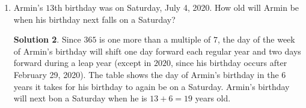 \documentclass{article}
\theoremstyle{definition}
\newtheorem*{solution}{Solution}
\begin{document}
\begin{multicols}{2}
\begin{enumerate}
\begin{solution}
                So, we have $A + B + C+ 2(D + E + F) + 72 = 293$, which simplifies to $A + B + C + 2(D + E + F) = 221$.
                We also know that $A + B + C + D + E + F + 24 + 5 = 200$, which simplifies to $A + B + C + D + E + F = 171$.
                The difference between these two equations is $D + E + F = 221 - 171 = 50$.
                Substituting this back into $A + B + C + D + E + F = 171$, we find that $A + B + C + 50 = 171$, so $A + B + C = 121$.
                Therefore, the number of people who own exactly one of the three is $121$ people.
                \begin{center}
                \end{center}
            \end{solution}
        \item Armin's $13$th birthday was on Saturday, July 4, 2020.
            How old will Armin be when his birthday next falls on a Saturday?
            \begin{solution}
                Since $365$ is one more than a multiple of $7$, the day of the week of Armin's birthday will shift one day forward each regular year and two days forward during a leap year (except in $2020$, since his birthday occurs after February 29, 2020).
                The table shows the day of Armin's birthday in the $6$ years it takes for his birthday to again be on a Saturday.
                Armin's birthday will next bon a Saturday when he is $13 + 6 = 19$ years old.
                \begin{center}
                    \begin{tabular}{|c|c|c|c|c|c|}

\end{tabular}
\end{center}
\end{solution}
\end{enumerate}
\end{multicols}
\end{document}
